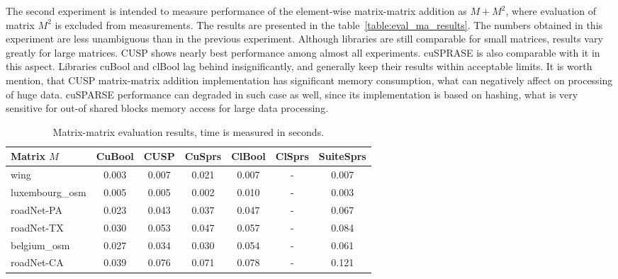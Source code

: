 The second experiment is intended to measure performance of the element-wise matrix-matrix addition as $M + M^2$, 
where evaluation of matrix $M^2$ is excluded from measurements.  
The results are presented in the table~\ref{table:eval_ma_results}. 
The numbers obtained in this experiment are less unambiguous than in the previous experiment. 
Although libraries are still comparable for small matrices, results vary greatly for large matrices. 
CUSP shows nearly best performance among almost all experiments. 
cuSPRASE is also comparable with it in this aspect. 
Libraries cuBool and clBool lag behind insignificantly, and generally keep their results within acceptable limits. 
It is worth mention, that CUSP matrix-matrix addition implementation has significant memory consumption,
what can negatively affect on processing of huge data. 
cuSPARSE performance can degraded in such case as well, since its implementation is based on hashing, 
what is very sensitive for out-of shared blocks memory access for large data processing.  

{\setlength{\tabcolsep}{0.3em}
\begin{table}[t]
\centering
{
\caption{Matrix-matrix evaluation results, time is measured in seconds.}
\label{table:eval_mm_results}
\scriptsize
{}
\begin{tabular}{|l|c|c|c|c|c|c|}
\hline

Matrix $M$      & CuBool  & CUSP    & CuSprs  & ClBool  & ClSprs  & SuiteSprs \\
\hline
\hline
wing            & 0.003   & 0.007   & 0.021   & 0.007   & -       & 0.007   \\
luxembourg\_osm & 0.005   & 0.005   & 0.002   & 0.010   & -       & 0.003   \\
roadNet-PA      & 0.023   & 0.043   & 0.037   & 0.047   & -       & 0.067   \\
roadNet-TX      & 0.030   & 0.053   & 0.047   & 0.057   & -       & 0.084   \\
belgium\_osm    & 0.027   & 0.034   & 0.030   & 0.054   & -       & 0.061   \\
roadNet-CA      & 0.039   & 0.076   & 0.071   & 0.078   & -       & 0.121   \\

\hline
\end{tabular}
}
\end{table}
}

